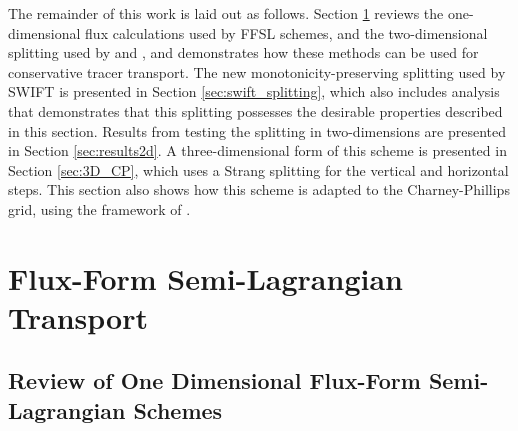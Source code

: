 \documentclass{ametsocV6.1}
\begin{document}
The remainder of this work is laid out as follows.
Section \ref{sec:ffsl} reviews the one-dimensional flux calculations used by FFSL schemes, and the two-dimensional  splitting used by \citet{leonard1996cosmic} and \citet{lin1996ffsl}, and demonstrates how these methods can be used for conservative tracer transport. The new monotonicity-preserving splitting used by SWIFT is presented in Section \ref{sec:swift_splitting}, which also includes analysis that demonstrates that this splitting possesses the desirable properties described in this section.
Results from testing the splitting in two-dimensions are presented in Section \ref{sec:results2d}.
A three-dimensional form of this scheme is presented in Section \ref{sec:3D_CP}, which uses a Strang splitting for the vertical and horizontal steps. This section also shows how this scheme is adapted to the Charney-Phillips grid, using the framework of \cite{bendall2023solution}.


\section{Flux-Form Semi-Lagrangian Transport} \label{sec:ffsl}

\subsection{Review of One Dimensional Flux-Form Semi-Lagrangian Schemes} \label{sec:1d_ffsl}
\end{document}
